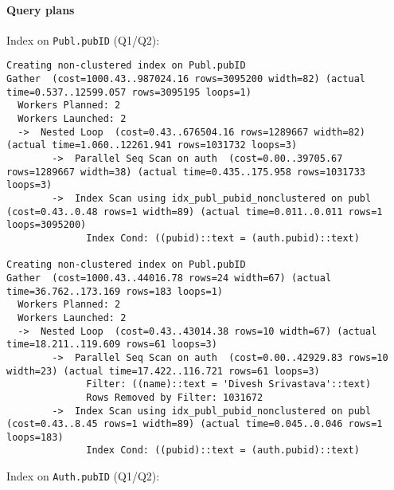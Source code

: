 \documentclass[11pt]{scrartcl}
\begin{document}
\paragraph{Query plans}\mbox{}

Index on \texttt{Publ.pubID} (Q1/Q2):

{\small
\parskip0pt\begin{verbatim}
Creating non-clustered index on Publ.pubID
Gather  (cost=1000.43..987024.16 rows=3095200 width=82) (actual time=0.537..12599.057 rows=3095195 loops=1)
  Workers Planned: 2
  Workers Launched: 2
  ->  Nested Loop  (cost=0.43..676504.16 rows=1289667 width=82) (actual time=1.060..12261.941 rows=1031732 loops=3)
        ->  Parallel Seq Scan on auth  (cost=0.00..39705.67 rows=1289667 width=38) (actual time=0.435..175.958 rows=1031733 loops=3)
        ->  Index Scan using idx_publ_pubid_nonclustered on publ  (cost=0.43..0.48 rows=1 width=89) (actual time=0.011..0.011 rows=1 loops=3095200)  
              Index Cond: ((pubid)::text = (auth.pubid)::text)

Creating non-clustered index on Publ.pubID
Gather  (cost=1000.43..44016.78 rows=24 width=67) (actual time=36.762..173.169 rows=183 loops=1)
  Workers Planned: 2
  Workers Launched: 2
  ->  Nested Loop  (cost=0.43..43014.38 rows=10 width=67) (actual time=18.211..119.609 rows=61 loops=3)
        ->  Parallel Seq Scan on auth  (cost=0.00..42929.83 rows=10 width=23) (actual time=17.422..116.721 rows=61 loops=3)
              Filter: ((name)::text = 'Divesh Srivastava'::text)
              Rows Removed by Filter: 1031672
        ->  Index Scan using idx_publ_pubid_nonclustered on publ  (cost=0.43..8.45 rows=1 width=89) (actual time=0.045..0.046 rows=1 loops=183)      
              Index Cond: ((pubid)::text = (auth.pubid)::text)
\end{verbatim}}

Index on \texttt{Auth.pubID} (Q1/Q2):
\end{document}
